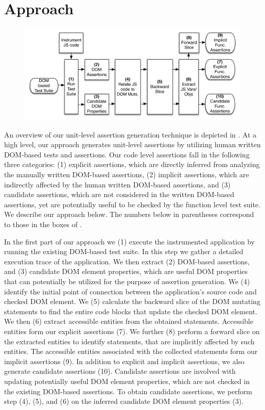 \section{Approach} \label{Sec:approach}

\begin{figure}[!t]
  \centering
  \includegraphics[width=.7\hsize]{fig/approachDiagram}
  \vspace{-0.1in} 
  \label{Fig:approachDiagram}
  \vspace{-0.1in} 
\end{figure}
An overview of our unit-level assertion generation technique is depicted in .
At a high level, our approach generates unit-level assertions by utilizing human written DOM-based tests and assertions. Our code level assertions fall in the following three categories: (1) explicit assertions, which are directly inferred from analyzing the manually written DOM-based assertions, (2) implicit assertions, which are indirectly affected by the human written DOM-based assertions, and (3) candidate assertions, which are not considered in the written DOM-based assertions, yet are potentially useful to be checked by the function level test suite. We describe our approach below. The numbers below in parentheses correspond to those in the boxes of .

In the first part of our approach we (1) execute the instrumented application by running the existing DOM-based test suite. In this step we gather a detailed execution trace of the application. We then extract (2) DOM-based assertions, and (3) candidate DOM element properties, which are useful DOM properties that can potentially be utilized for the purpose of assertion generation. We (4) identify the initial point of connection between the application's source code and checked DOM element. 
We (5) calculate the backward slice of the DOM mutating statements to find the entire code blocks that update the checked DOM element. We then (6) extract accessible entities from the obtained statements. Accessible entities form our explicit assertions (7). We further (8) perform a forward slice on the extracted entities to identify statements, that are implicitly affected by such entities. The accessible entities associated with the collected statements form our implicit assertions (9). In addition to explicit and implicit assertions, we also generate candidate assertions (10). Candidate assertions are involved with updating potentially useful DOM element properties, which are not checked in the existing DOM-based assertions. To obtain candidate assertions, we perform step (4), (5), and (6) on the inferred candidate DOM element properties (3).

